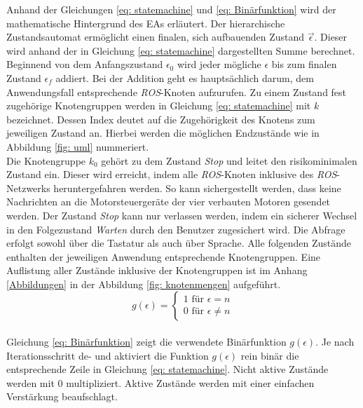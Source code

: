 		Anhand der Gleichungen \ref{eq: statemachine} und \ref{eq: Binärfunktion} wird der mathematische Hintergrund des EAs erläutert. Der hierarchische Zustandsautomat ermöglicht einen finalen, sich aufbauenden Zustand $\vec{\epsilon}$. Dieser wird anhand der in Gleichung \ref{eq: statemachine} dargestellten Summe berechnet. Beginnend von dem Anfangszustand $\epsilon_0$ wird jeder mögliche $\epsilon$ bis zum finalen Zustand $\epsilon_f$ addiert. Bei der Addition geht es hauptsächlich darum, dem Anwendungsfall entsprechende \textit{ROS}-Knoten aufzurufen. Zu einem Zustand fest zugehörige Knotengruppen werden in Gleichung \ref{eq: statemachine} mit $k$ bezeichnet. Dessen Index deutet auf die Zugehörigkeit des Knotens zum jeweiligen Zustand an. Hierbei werden die möglichen Endzustände wie in Abbildung \ref{fig: uml} nummeriert.\\
		
		Die Knotengruppe $k_0$ gehört zu dem Zustand \textit{Stop} und leitet den risikominimalen Zustand ein. Dieser wird erreicht, indem alle \textit{ROS}-Knoten inklusive des \textit{ROS}-Netzwerks heruntergefahren werden. So kann sichergestellt werden, dass keine Nachrichten an die Motorsteuergeräte der vier verbauten Motoren gesendet werden. Der Zustand \textit{Stop} kann nur verlassen werden, indem ein sicherer Wechsel in den Folgezustand \textit{Warten} durch den Benutzer zugesichert wird. Die Abfrage erfolgt sowohl über die Tastatur als auch über Sprache. Alle folgenden Zustände enthalten der jeweiligen Anwendung entsprechende Knotengruppen. Eine Auflistung aller Zustände inklusive der Knotengruppen ist im Anhang \ref{Abbildungen} in der Abbildung \ref{fig: knotenmengen} aufgeführt.\\ 
	
	\begin{equation}
	g(\epsilon)=\left\{\begin{array}{ll} 1 \text{ für } \epsilon=n \\
	0 \text{ für }\epsilon\neq n\end{array}\right. 
	\label{eq: Binärfunktion}
	\end{equation}\\
		
		Gleichung \ref{eq: Binärfunktion} zeigt die verwendete Binärfunktion $g(\epsilon)$. Je nach Iterationsschritt de- und aktiviert die Funktion $g(\epsilon)$ rein binär die entsprechende Zeile in Gleichung \ref{eq: statemachine}. Nicht aktive Zustände werden mit 0 multipliziert. Aktive Zustände werden mit einer einfachen Verstärkung beaufschlagt. \\
		
